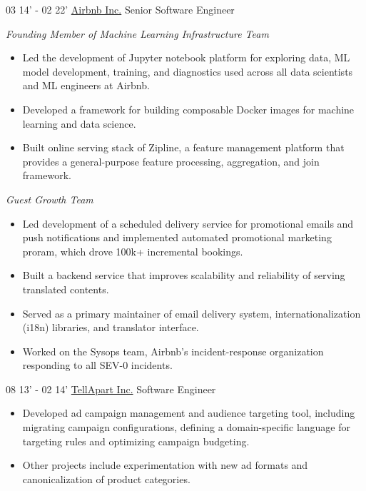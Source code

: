 \documentclass[]{patyoon-cv}
\begin{document}
\begin{entrylist}
  \entry
  {03 14' - 02 22'}
  {\href{https://www.airbnb.com/}{Airbnb Inc.}}
  {Senior Software Engineer}
    {\begin{spacing}{0.5} \end{spacing}
      \emph{\small Founding Member of Machine Learning Infrastructure Team}\\
          \begin{itemize}
    \item Led the development of Jupyter notebook platform for exploring data, ML model development, training, and diagnostics used across all data scientists and ML engineers at Airbnb.
    \item Developed a framework for building composable Docker images for machine learning and data science.
    \item Built online serving stack of Zipline, a feature management platform that provides a general-purpose feature processing, aggregation, and join framework.
    \end{itemize}
  \begin{spacing}{1.5} \end{spacing}
      \emph{\small Guest Growth Team}\\
    \begin{itemize}
    \item Led development of a scheduled delivery service for promotional emails and push notifications and implemented automated promotional marketing proram, which drove 100k+ incremental bookings.
    \item Built a backend service that improves scalability and reliability of serving translated contents.
    \item Served as a primary maintainer of email delivery system, internationalization (i18n) libraries, and translator interface.
    \item Worked on the Sysops team, Airbnb's incident-response organization responding to all SEV-0 incidents.
    \end{itemize}
  }
  \entry
  {08 13' - 02 14'}
  {\href{https://tellapart.com/}{TellApart Inc.}}
  {Software Engineer}
  {\begin{itemize}
    \item Developed ad campaign management and audience targeting tool, including migrating campaign configurations, defining a domain-specific language for targeting rules and optimizing campaign budgeting.
    \item Other projects include experimentation with new ad formats and canonicalization of product categories.

\end{itemize}}
\end{entrylist}
\end{document}
